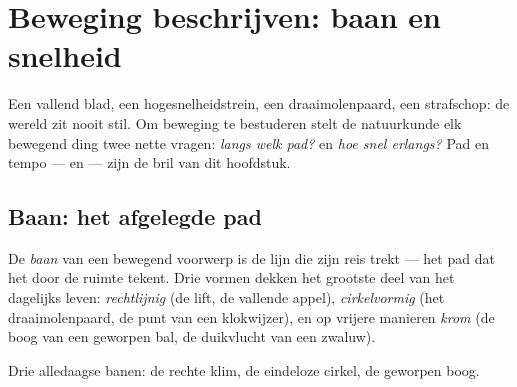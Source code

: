 \chapter{Beweging beschrijven: baan en snelheid}\label{ch:g6:describing-motion}

Een vallend blad, een hogesnelheidstrein, een draaimolenpaard, een
strafschop: de wereld zit nooit stil. Om beweging te bestuderen stelt
de natuurkunde elk bewegend ding twee nette vragen: \emph{langs welk
pad?} en \emph{hoe snel erlangs?} Pad en tempo ---  en
 --- zijn de bril van dit hoofdstuk.

\section{Baan: het afgelegde pad}

\begin{definition}[Baan]\label{def:g6:describing-motion:trajectory}
De \emph{baan} van een bewegend voorwerp is de lijn die
zijn reis trekt --- het pad dat het door de ruimte tekent. Drie vormen
dekken het grootste deel van het dagelijks leven:
\emph{rechtlijnig} (de lift, de vallende
appel), \emph{cirkelvormig} (het
draaimolenpaard, de punt van een klokwijzer), en op vrijere manieren
\emph{krom} (de boog van een geworpen bal, de duikvlucht van een
zwaluw).
\end{definition}

\begin{omfigure}

{\small Drie alledaagse banen: de rechte klim, de eindeloze cirkel, de
geworpen boog.}
\end{omfigure}

